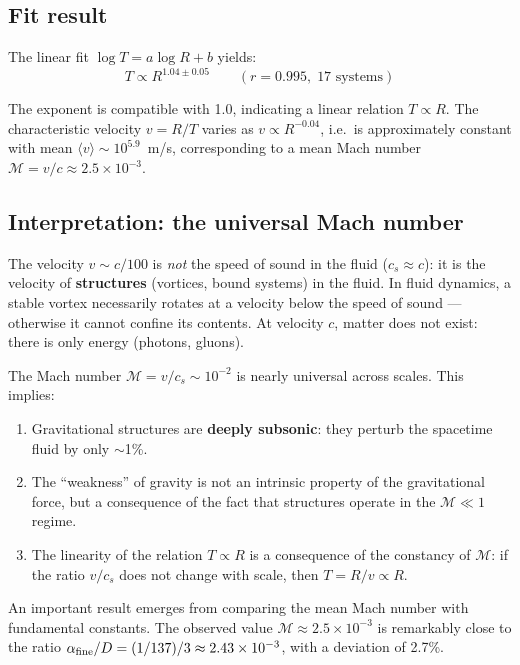 \documentclass[10pt,a4paper]{article}
\begin{document}
\subsection{Fit result}

The linear fit $\log T = a \log R + b$ yields:
\begin{equation}
T \propto R^{1.04 \pm 0.05} \qquad (r = 0.995, \; 17 \text{ systems})
\end{equation}

The exponent is compatible with 1.0, indicating a linear relation $T \propto R$. The characteristic velocity $v = R/T$ varies as $v \propto R^{-0.04}$, i.e.\ is approximately constant with mean $\langle v \rangle \sim 10^{5.9}$~m/s, corresponding to a mean Mach number $\mathcal{M} = v/c \approx 2.5 \times 10^{-3}$.

\subsection{Interpretation: the universal Mach number}

The velocity $v \sim c/100$ is \textit{not} the speed of sound in the fluid ($c_s \approx c$): it is the velocity of \textbf{structures} (vortices, bound systems) in the fluid. In fluid dynamics, a stable vortex necessarily rotates at a velocity below the speed of sound --- otherwise it cannot confine its contents. At velocity $c$, matter does not exist: there is only energy (photons, gluons).

The Mach number $\mathcal{M} = v/c_s \sim 10^{-2}$ is nearly universal across scales. This implies:

\begin{enumerate}
\item Gravitational structures are \textbf{deeply subsonic}: they perturb the spacetime fluid by only $\sim$1\%.

\item The ``weakness'' of gravity is not an intrinsic property of the gravitational force, but a consequence of the fact that structures operate in the $\mathcal{M} \ll 1$ regime.

\item The linearity of the relation $T \propto R$ is a consequence of the constancy of $\mathcal{M}$: if the ratio $v/c_s$ does not change with scale, then $T = R/v \propto R$.
\end{enumerate}

An important result emerges from comparing the mean Mach number with fundamental constants. The observed value $\mathcal{M} \approx 2.5 \times 10^{-3}$ is remarkably close to the ratio $\alpha_{\rm fine}/D = (1/137)/3 \approx 2.43 \times 10^{-3}$, with a deviation of 2.7\%.
\end{document}
